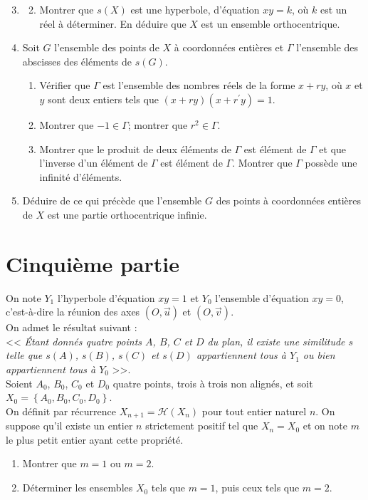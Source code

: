 \documentclass[landscape,twocolumn,leqno,a4paper,10pt]{report} %
\newcommand\n{\noindent}
\begin{document}
\begin{enumerate}\setcounter{enumi}{2}
	\item[] \begin{enumerate}\setcounter{enumi}{1}
		\item Montrer que $s(X)$ est une hyperbole, d'équation $x y=k$, où $k$ est un réel à déterminer. En déduire que $X$ est un ensemble orthocentrique.
	\end{enumerate}
	\item Soit $G$ l'ensemble des points de $X$ à coordonnées entières et $\Gamma$ l'ensemble des abscisses des éléments de $s(G)$.
	\begin{enumerate}
		\item Vérifier que $\Gamma$ est l'ensemble des nombres réels de la forme $x+r y$, où $x$ et $y$ sont deux entiers tels que $(x+r y)\left(x+r^{\prime} y\right)=1$.
		\item Montrer que $-1 \in \Gamma$; montrer que $r^{2} \in \Gamma$.
		\item Montrer que le produit de deux éléments de $\Gamma$ est élément de $\Gamma$ et que l'inverse d'un élément de $\Gamma$ est élément de $\Gamma$. Montrer que $\Gamma$ possède une infinité d'éléments.
	\end{enumerate}
	\item Déduire de ce qui précède que l'ensemble $G$ des points à coordonnées entières de $X$ est une partie orthocentrique infinie.
\end{enumerate}


\section{Cinquième partie}

\n On note $Y_{1}$ l'hyperbole d'équation $x y=1$ et $Y_{0}$ l'ensemble d'équation $x y=0$, c'est-à-dire la réunion des axes $(O, \vec{u})$ et $(O, \vec{v})$.\\
On admet le résultat suivant :\\
<< \textit{Étant donnés quatre points $A$, $B$, $C$ et $D$ du plan, il existe une similitude $s$ telle que $s(A)$, $s(B)$, $s(C)$ et $s(D)$ appartiennent tous à $Y_{1}$ ou bien appartiennent tous à $Y_{0}$} >>.\\

Soient $A_{0}$, $B_{0}$, $C_{0}$ et $D_{0}$ quatre points, trois à trois non alignés, et soit $X_{0}=\left\{A_{0}, B_{0}, C_{0}, D_{0}\right\}$.\\
On définit par récurrence $X_{n+1}=\mathcal{H}\left(X_{n}\right)$ pour tout entier naturel $n$. On suppose qu'il existe un entier $n$ strictement positif tel que $X_{n}=X_{0}$ et on note $m$ le plus petit entier ayant cette propriété.

\begin{enumerate}
	\item Montrer que $m=1$ ou $m=2$.
	\item Déterminer les ensembles $X_{0}$ tels que $m=1$, puis ceux tels que $m=2$.
\end{enumerate}
\end{document}
